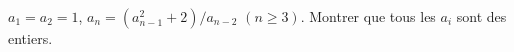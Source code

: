 $a_1 = a_2 = 1$, $a_n = (a_{n-1}^2 + 2)/a_{n-2}$ $(n \geq 3)$. Montrer que tous les $a_i$ sont des entiers.
